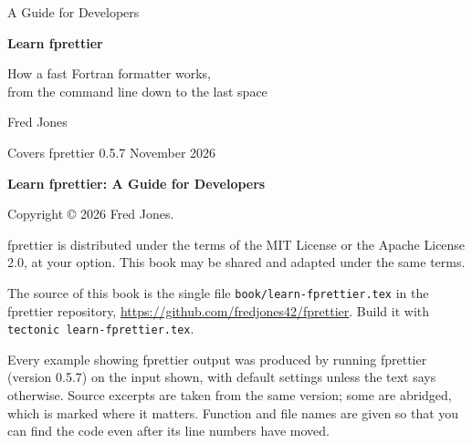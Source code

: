 \documentclass[11pt,a4paper,openany]{book}
\newcommand{\code}[1]{\texttt{\small #1}}
\newcommand{\file}[1]{\texttt{\small\color{accent}#1}}
\begin{document}
\frontmatter
\begin{titlepage}
\centering
\vspace*{3cm}
{\sffamily\color{accent}\large A Guide for Developers\par}
\vspace{0.6cm}
{\sffamily\bfseries\color{ink}\fontsize{42}{48}\selectfont Learn fprettier\par}
\vspace{0.8cm}
{\sffamily\large\color{ink}How a fast Fortran formatter works,\\ from the command line down to the last space\par}
\vspace{2cm}
\vfill
{\sffamily\large Fred Jones\par}
\vspace{0.3cm}
{\sffamily\small\color{commentc} Covers fprettier 0.5.7 \textperiodcentered{} November 2026\par}
\end{titlepage}

\thispagestyle{empty}
\vspace*{\fill}
{\small
\textbf{Learn fprettier: A Guide for Developers}\par\medskip
Copyright \copyright{} 2026 Fred Jones.\par\medskip
fprettier is distributed under the terms of the MIT License or the Apache
License 2.0, at your option. This book may be shared and adapted under the same
terms.\par\medskip
The source of this book is the single file \file{book/learn-fprettier.tex} in
the fprettier repository, \url{https://github.com/fredjones42/fprettier}. Build it with
\code{tectonic learn-fprettier.tex}.\par\medskip
Every example showing fprettier output was produced by running fprettier
(version 0.5.7) on the input shown, with default settings unless the text says otherwise.
Source excerpts are taken from the same version; some are abridged, which is
marked where it matters. Function and file names are given so that you can find
the code even after its line numbers have moved.\par}
\end{document}
